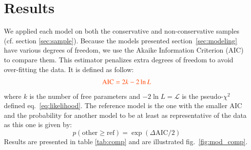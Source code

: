 \documentclass[]{aa} %
\newcommand{\nn}[1]{{\textcolor[rgb]{1, 0.27, 0}{#1}}}
\begin{document}
\section{Results}
\label{sec:results}
We applied each model on both the conservative and non-conservative samples (cf.
section \ref{sec:sample}). Because the models presented
section~\ref{sec:modeling} have various degrees of freedom, we use the Akaike
Information Criterion (AIC) \citep{burnham2004} to compare them. This estimator
penalizes extra degrees of freedom to avoid over-fitting the data. It is defined
as follow:
\begin{equation}
    \nn{\mathrm{AIC} = 2k - 2\ln L}
\end{equation}
where $k$ is the number of free parameters and \nn{$-2\ln L = \mathcal{L}$} is
the pseudo-$\chi^2$ defined eq.~\eqref{eq:likelihood}. The \nn{reference} model
is the one with the smaller AIC and the probability for another model to be at
least as representative of the data as this one is given by:
\begin{equation}
    p(\mathrm{other} \geq \mathrm{ref}) =
    \exp\left(\Delta\mathrm{AIC}/2\right)
\end{equation}
Results are presented in table \ref{tab:comp} and are illustrated
fig.~\ref{fig:mod_comp}.
\end{document}
